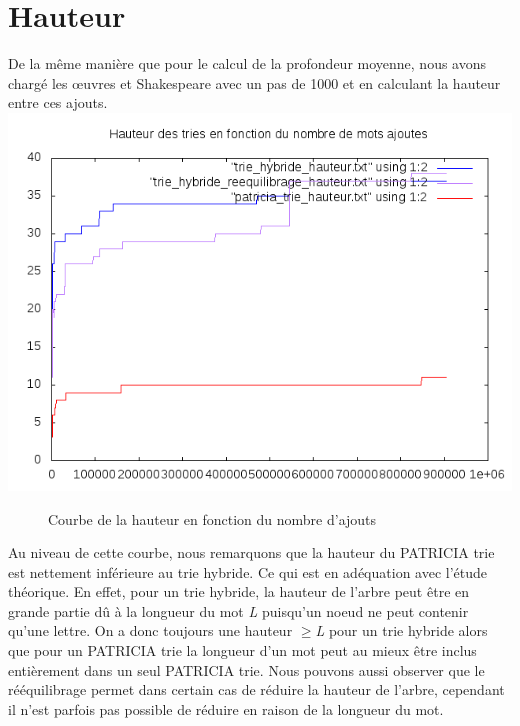 \documentclass[a4paper,12pt]{report}
\begin{document}
\section{Hauteur}
De la même manière que pour le calcul de la profondeur moyenne, nous avons chargé les œuvres et Shakespeare avec un pas de 1000
et en calculant la hauteur entre ces ajouts.\\
\includegraphics{../comparaison/courbe_hauteur.png}
\begin{figure}[!htbp]
\caption{Courbe de la hauteur en fonction du nombre d'ajouts}
\end{figure}

Au niveau de cette courbe, nous remarquons que la hauteur du PATRICIA trie est nettement inférieure au trie hybride. Ce
qui est en adéquation avec l'étude théorique.
En effet, pour un trie hybride, la hauteur de l'arbre peut être en grande partie dû à la longueur du mot \textit{L} puisqu'un noeud
ne peut contenir qu'une lettre. On a donc toujours une hauteur $\geq$\textit{L} pour un trie hybride alors que pour un PATRICIA trie
la longueur d'un mot peut au mieux être inclus entièrement dans un seul PATRICIA trie.
Nous pouvons aussi observer que le rééquilibrage permet dans certain cas de réduire la hauteur de l'arbre, cependant
il n'est parfois pas possible de réduire en raison de la longueur du mot.
\end{document}
